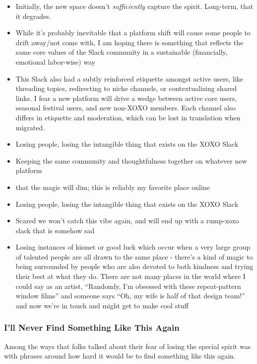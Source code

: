 \documentclass[
]{book}
\providecommand{\tightlist}{%
  \setlength{\itemsep}{0pt}\setlength{\parskip}{0pt}}
\begin{document}
\begin{itemize}
\tightlist
\item
  Initially, the new space doesn't \emph{sufficiently} capture the spirit. Long-term, that it degrades.
\item
  While it's probably inevitable that a platform shift will cause some people to drift away/not come with, I am hoping there is something that reflects the same core values of the Slack community in a sustainable (financially, emotional labor-wise) way
\item
  This Slack also had a subtly reinforced etiquette amongst active users, like threading topics, redirecting to niche channels, or contextualizing shared links. I fear a new platform will drive a wedge between active core users, seasonal festival users, and new non-XOXO members. Each channel also differs in etiquette and moderation, which can be lost in translation when migrated.
\item
  Losing people, losing the intangible thing that exists on the XOXO Slack
\item
  Keeping the same community and thoughtfulness together on whatever new platform
\item
  that the magic will dim; this is reliably my favorite place online
\item
  Losing people, losing the intangible thing that exists on the XOXO Slack
\item
  Scared we won't catch this vibe again, and will end up with a rump-xoxo slack that is somehow sad
\item
  Losing instances of kismet or good luck which occur when a very large group of talented people are all drawn to the same place - there's a kind of magic to being surrounded by people who are also devoted to both kindness and trying their best at what they do. There are not many places in the world where I could say as an artist, ``Randomly, I'm obsessed with these repeat-pattern window films'' and someone says ``Oh, my wife is half of that design team!'' and now we're in touch and might get to make cool stuff
\end{itemize}

\subsubsection{I'll Never Find Something Like This Again}\label{ill-never-find-something-like-this-again}

Among the ways that folks talked about their fear of losing the special spirit was with phrases around how hard it would be to find something like this again.
\end{document}
